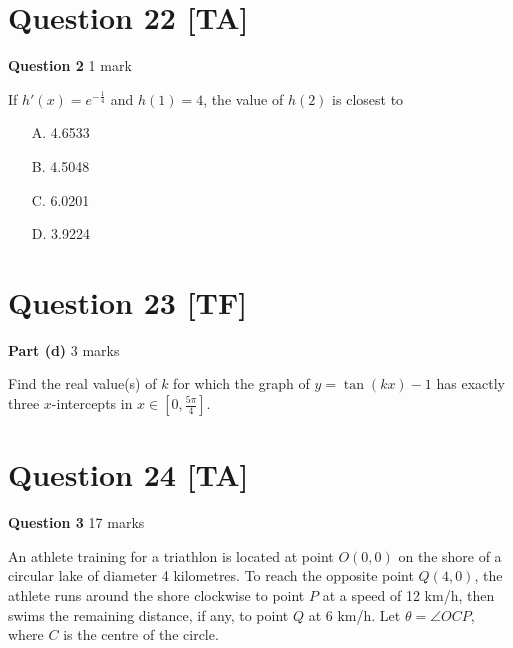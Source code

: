 \documentclass[10pt,a4paper]{article}
\begin{document}
\hrulefill

\section*{Question 22 [TA]}

\textbf{Question 2} \hfill 1 mark

If $h'(x) = e^{-\frac{1}{4}}$ and $h(1) = 4$, the value of $h(2)$ is closest to

\begin{enumerate}
    \item[A.] 4.6533
    \item[B.] 4.5048
    \item[C.] 6.0201
    \item[D.] 3.9224
\end{enumerate}

\vspace{9\baselineskip}

\hrulefill

\section*{Question 23 [TF]}

\textbf{Part (d)} \hfill 3 marks

Find the real value(s) of $k$ for which the graph of $y = \tan(kx) - 1$ has exactly three $x$-intercepts in $x \in \left[0, \frac{5\pi}{4}\right]$.

\vspace{9\baselineskip}

\hrulefill

\section*{Question 24 [TA]}

\textbf{Question 3} \hfill 17 marks

An athlete training for a triathlon is located at point $O(0,0)$ on the shore of a circular lake of diameter 4 kilometres. To reach the opposite point $Q(4,0)$, the athlete runs around the shore clockwise to point $P$ at a speed of 12 km/h, then swims the remaining distance, if any, to point $Q$ at 6 km/h. Let $\theta = \angle OCP$, where $C$ is the centre of the circle.
\end{document}
